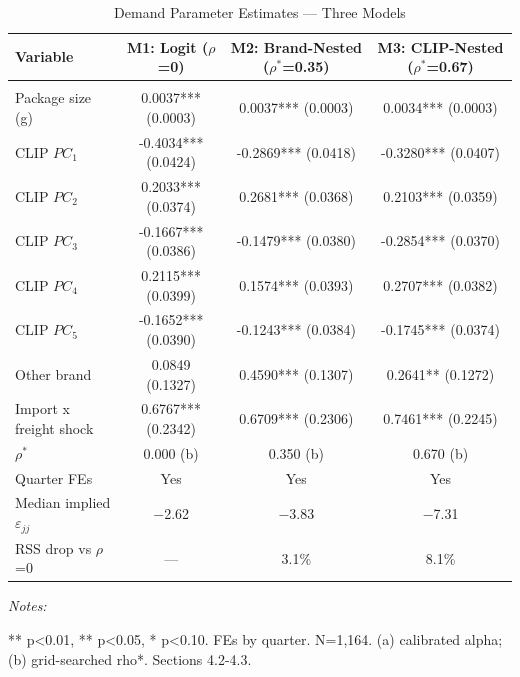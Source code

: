 \begin{table}[H]
\centering
\caption{\label{tab:table2}Demand Parameter Estimates --- Three Models}
\centering
\fontsize{9}{11}\selectfont
\begin{threeparttable}
\begin{tabular}[t]{lccc}
\toprule
Variable & M1: Logit ($\rho$=0) & M2: Brand-Nested ($\rho^*$=0.35) & M3: CLIP-Nested ($\rho^*$=0.67)\\
\midrule
\cellcolor[HTML]{EEF2FF}{\textbf{$\alpha$ (price)}} & \cellcolor[HTML]{EEF2FF}{\textbf{$-$0.310 (a)}} & \cellcolor[HTML]{EEF2FF}{\textbf{$-$0.310 (a)}} & \cellcolor[HTML]{EEF2FF}{\textbf{$-$0.310 (a)}}\\
Package size (g) & 0.0037*** (0.0003) & 0.0037*** (0.0003) & 0.0034*** (0.0003)\\
CLIP $PC_1$ & -0.4034*** (0.0424) & -0.2869*** (0.0418) & -0.3280*** (0.0407)\\
CLIP $PC_2$ & 0.2033*** (0.0374) & 0.2681*** (0.0368) & 0.2103*** (0.0359)\\
CLIP $PC_3$ & -0.1667*** (0.0386) & -0.1479*** (0.0380) & -0.2854*** (0.0370)\\
\addlinespace
CLIP $PC_4$ & 0.2115*** (0.0399) & 0.1574*** (0.0393) & 0.2707*** (0.0382)\\
CLIP $PC_5$ & -0.1652*** (0.0390) & -0.1243*** (0.0384) & -0.1745*** (0.0374)\\
Other brand & 0.0849 (0.1327) & 0.4590*** (0.1307) & 0.2641** (0.1272)\\
Import x freight shock & 0.6767*** (0.2342) & 0.6709*** (0.2306) & 0.7461*** (0.2245)\\
$\rho^*$ & 0.000 (b) & 0.350 (b) & 0.670 (b)\\
\midrule
\addlinespace
Quarter FEs & Yes & Yes & Yes\\
Median implied $\varepsilon_{jj}$ & $-$2.62 & $-$3.83 & $-$7.31\\
RSS drop vs $\rho$=0 & --- & 3.1\% & 8.1\%\\
\bottomrule
\end{tabular}
\begin{tablenotes}
\item \textit{Notes: } 
\item *** p<0.01, ** p<0.05, * p<0.10. FEs by quarter. N=1,164. (a) calibrated alpha; (b) grid-searched rho*. Sections 4.2-4.3.
\end{tablenotes}
\end{threeparttable}
\end{table}

